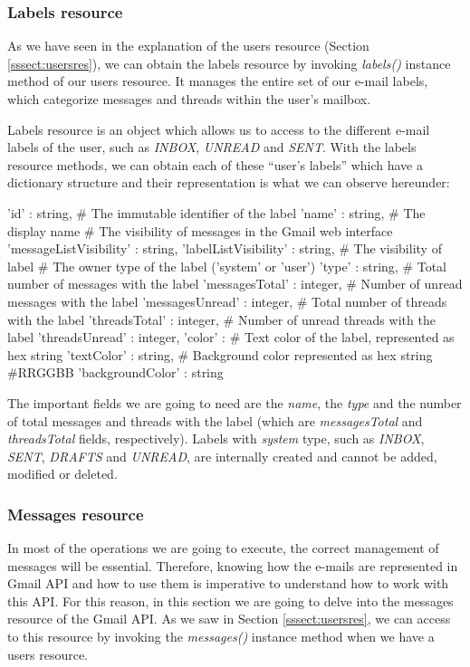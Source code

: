 \subsubsection{Labels resource}\label{sssect:labres}
As we have seen in the explanation of the users resource (Section \ref{sssect:usersres}), we can obtain the labels resource \citep[/v1/reference/users/labels]{gmailAPI} by invoking \textit{labels()} instance method of our users resource. It manages the entire set of our e-mail labels, which  categorize messages and threads within the user's mailbox.

Labels resource is an object which allows us to access to the different e-mail labels of the user, such as \textit{INBOX}, \textit{UNREAD} and \textit{SENT}. With the labels resource methods, we can obtain each of these ``user's labels'' which have a dictionary structure and their representation is what we can observe hereunder:

\begin{python}
	{
		'id' : string, # The immutable identifier of the label
		'name' : string, # The display name
		# The visibility of messages in the Gmail web interface
		'messageListVisibility' : string,
		'labelListVisibility' : string, # The visibility of label
		# The owner type of the label ('system' or 'user')
		'type' : string,
		# Total number of messages with the label
		'messagesTotal' : integer,
		# Number of unread messages with the label
		'messagesUnread' : integer,
		# Total number of threads with the label
		'threadsTotal' : integer,
		# Number of unread threads with the label
		'threadsUnread' : integer,
		'color' : {
			# Text color of the label, represented as hex string
			'textColor' : string,
			# Background color represented as hex string #RRGGBB
			'backgroundColor' : string 
		}
	}
\end{python}

The important fields we are going to need are the \textit{name}, the \textit{type} and the number of total messages and threads with the label (which are \textit{messagesTotal} and \textit{threadsTotal} fields, respectively). Labels with \textit{system} type, such as \textit{INBOX}, \textit{SENT}, \textit{DRAFTS} and \textit{UNREAD}, are internally created and cannot be added, modified or deleted.

\subsubsection{Messages resource}\label{sssect:msgres}
In most of the operations we are going to execute, the correct management of messages will be essential. Therefore, knowing how the e-mails are represented in Gmail API and how to use them is imperative to understand how to work with this API. For this reason, in this section we are going to delve into the messages resource \citep[/v1/reference/users/messages]{gmailAPI} of the Gmail API. As we saw in Section \ref{sssect:usersres}, we can access to this resource by invoking the \textit{messages()} instance method when we have a users resource.

